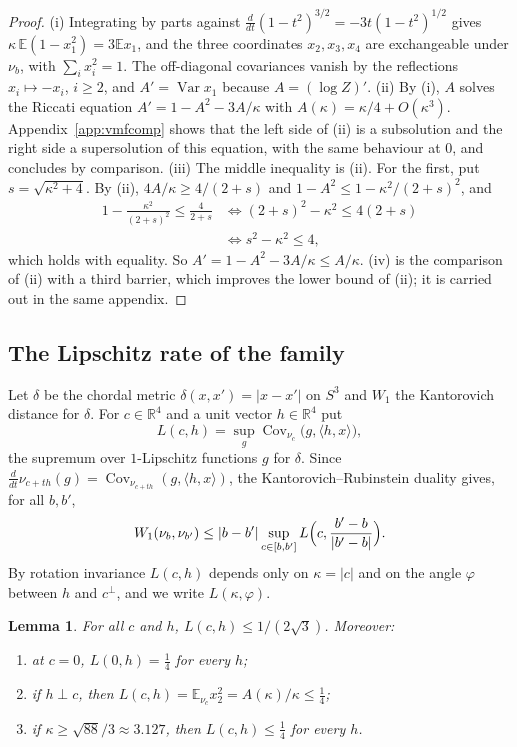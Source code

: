 \documentclass[11pt]{amsart}
\newtheorem{lemma}[theorem]{Lemma}
\theoremstyle{definition}
\theoremstyle{remark}
\numberwithin{equation}{section}
\newcommand{\R}{\mathbb{R}}
\newcommand{\E}{\mathbb{E}}
\newcommand{\Cov}{\operatorname{Cov}}
\newcommand{\Var}{\operatorname{Var}}
\newcommand{\ip}[2]{\langle #1,#2\rangle}
\begin{document}
\begin{proof}
(i) Integrating by parts against $\frac{d}{dt}(1-t^2)^{3/2}=-3t(1-t^2)^{1/2}$
gives $\kappa\,\E(1-x_1^2)=3\E x_1$, and the three coordinates
$x_2,x_3,x_4$ are exchangeable under $\nu_b$, with $\sum_ix_i^2=1$. The
off-diagonal covariances vanish by the reflections $x_i\mapsto-x_i$,
$i\ge2$, and $A'=\Var x_1$ because $A=(\log Z)'$.
(ii) By (i), $A$ solves the Riccati equation $A'=1-A^2-3A/\kappa$ with
$A(\kappa)=\kappa/4+O(\kappa^3)$. Appendix~\ref{app:vmfcomp} shows that the left
side of (ii) is a subsolution and the right side a supersolution of this
equation, with the same behaviour at $0$, and concludes by comparison.
(iii) The middle inequality is (ii). For the first, put $s=\sqrt{\kappa^2+4}$.
By (ii), $4A/\kappa\ge4/(2+s)$ and $1-A^2\le1-\kappa^2/(2+s)^2$, and
\[
\begin{aligned}
1-\frac{\kappa^2}{(2+s)^2}\le\frac4{2+s}
&\iff(2+s)^2-\kappa^2\le4(2+s)\\
&\iff s^2-\kappa^2\le4,
\end{aligned}
\]
which holds with equality. So $A'=1-A^2-3A/\kappa\le A/\kappa$.
(iv) is the comparison of (ii) with a third barrier, which improves the
lower bound of (ii); it is carried out in the same appendix.
\end{proof}

\subsection{The Lipschitz rate of the family}

Let $\delta$ be the chordal metric $\delta(x,x')=|x-x'|$ on $S^3$ and $W_1$
the Kantorovich distance for $\delta$. For $c\in\R^4$ and a unit vector
$h\in\R^4$ put
\begin{equation}\label{q-eq:rate}
L(c,h)=\sup_g\Cov_{\nu_c}\bigl(g,\ip hx\bigr),
\end{equation}
the supremum over $1$-Lipschitz functions $g$ for $\delta$. Since
$\frac{d}{dt}\nu_{c+th}(g)=\Cov_{\nu_{c+th}}(g,\ip hx)$, the
Kantorovich--Rubinstein duality gives, for all $b,b'$,
\begin{equation}\label{q-eq:w1segment}
W_1(\nu_b,\nu_{b'})\le|b-b'|\sup_{c\in[b,b']}L\Bigl(c,\frac{b'-b}{|b'-b|}
\Bigr).
\end{equation}
By rotation invariance $L(c,h)$ depends only on $\kappa=|c|$ and on the angle
$\varphi$ between $h$ and $c^\perp$, and we write $L(\kappa,\varphi)$.

\begin{lemma}\label{q-lem:rate}
For all $c$ and $h$, $L(c,h)\le1/(2\sqrt3)$. Moreover:
\begin{enumerate}[label=\textup{(\roman*)},leftmargin=*]
\item at $c=0$, $L(0,h)=\frac14$ for every $h$;
\item if $h\perp c$, then $L(c,h)=\E_{\nu_c}x_2^2=A(\kappa)/\kappa\le\frac14$;
\item if $\kappa\ge\sqrt{88}/3\approx3.127$, then $L(c,h)\le\frac14$ for
every $h$.
\end{enumerate}
\end{lemma}
\end{document}
